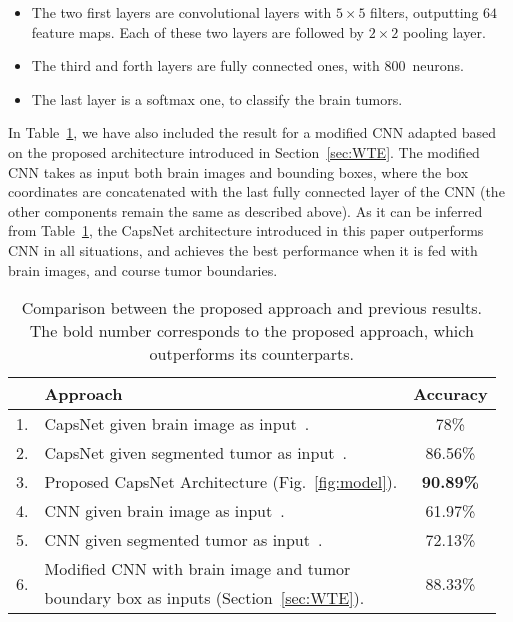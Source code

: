\documentclass{article}
\begin{document}
%
\begin{itemize}
\item The two first layers are  convolutional layers with $5 \times 5$ filters, outputting $64$ feature maps. Each of these two layers are followed by $2 \times 2$ pooling layer.
\vspace{-.0125in}
\item The third and forth layers are fully connected ones, with $800$~neurons.
\vspace{-.0125in}
\item The last layer is a softmax one, to classify the brain tumors.
\vspace{-.0125in}
\end{itemize}
%
In Table~\ref{tab:comp}, we have also included the result for a modified CNN adapted based on the proposed architecture introduced in Section~\ref{sec:WTE}. The modified CNN takes as input both brain images and bounding boxes, where the box coordinates are concatenated with the last fully connected layer of the CNN (the other components remain the same as described above). As it can be inferred from Table~\ref{tab:comp}, the CapsNet architecture introduced in this paper outperforms CNN in all situations, and achieves the best performance when it is fed with brain images, and course tumor boundaries.

\begin{table}[t!]
\caption{\footnotesize Comparison between the proposed approach and previous results. The bold number corresponds to the proposed approach, which outperforms its counterparts.}
\vspace{.05in}
\label{tab:comp}
\centering
\begin{tabular}{|c|l|c|}
\hline
& \textbf{Approach} & \textbf{Accuracy} \\
\hline
1. & CapsNet given brain image as input~\cite{Parnian:ICIP18}. & 78\% \\
\hline
2. & CapsNet given segmented tumor as input~\cite{Parnian:ICIP18}.& {86.56\%} \\
\hline
3. & Proposed CapsNet Architecture (Fig.~\ref{fig:model}). & \textbf{90.89\%}\\
\hline
4. & CNN given brain image as input~\cite{Justin:2017}. & 61.97\%\\
\hline
5. & CNN given segmented tumor as input~\cite{Justin:2017}. & 72.13\%\\
\hline
\multirow{ 2}{*}{6.} & Modified CNN with brain image and tumor & \multirow{ 2}{*}{88.33\%}\\
&  boundary box as inputs (Section~\ref{sec:WTE}). &\\
\hline
\end{tabular}
\vspace{-.15in}
\end{table}
\end{document}

